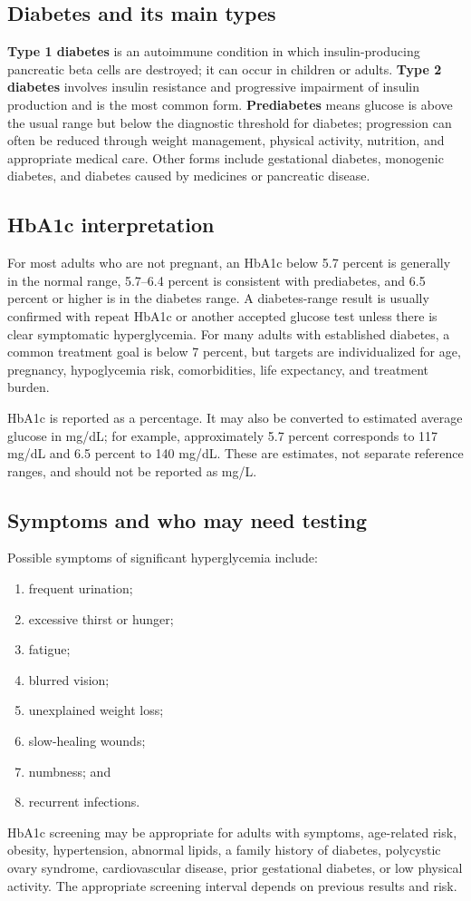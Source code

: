 \documentclass[11pt,openany]{book}
\begin{document}
\subsection*{Diabetes and its main types}
\textbf{Type 1 diabetes} is an autoimmune condition in which insulin-producing
pancreatic beta cells are destroyed; it can occur in children or adults.
\textbf{Type 2 diabetes} involves insulin resistance and progressive impairment
of insulin production and is the most common form. \textbf{Prediabetes} means
glucose is above the usual range but below the diagnostic threshold for
diabetes; progression can often be reduced through weight management, physical
activity, nutrition, and appropriate medical care. Other forms include
gestational diabetes, monogenic diabetes, and diabetes caused by medicines or
pancreatic disease.

\subsection*{HbA1c interpretation}
For most adults who are not pregnant, an HbA1c below 5.7 percent is generally
in the normal range, 5.7--6.4 percent is consistent with prediabetes, and 6.5
percent or higher is in the diabetes range. A diabetes-range result is usually
confirmed with repeat HbA1c or another accepted glucose test unless there is
clear symptomatic hyperglycemia. For many adults with established diabetes, a
common treatment goal is below 7 percent, but targets are individualized for
age, pregnancy, hypoglycemia risk, comorbidities, life expectancy, and treatment
burden.

HbA1c is reported as a percentage. It may also be converted to estimated
average glucose in mg/dL; for example, approximately 5.7 percent corresponds
to 117 mg/dL and 6.5 percent to 140 mg/dL. These are estimates, not separate
reference ranges, and should not be reported as mg/L.

\subsection*{Symptoms and who may need testing}
Possible symptoms of significant hyperglycemia include:
\begin{enumerate}[leftmargin=*]
  \item frequent urination;
  \item excessive thirst or hunger;
  \item fatigue;
  \item blurred vision;
  \item unexplained weight loss;
  \item slow-healing wounds;
  \item numbness; and
  \item recurrent infections.
\end{enumerate}
HbA1c screening may be
appropriate for adults with symptoms, age-related risk, obesity, hypertension,
abnormal lipids, a family history of diabetes, polycystic ovary syndrome,
cardiovascular disease, prior gestational diabetes, or low physical activity.
The appropriate screening interval depends on previous results and risk.
\end{document}

